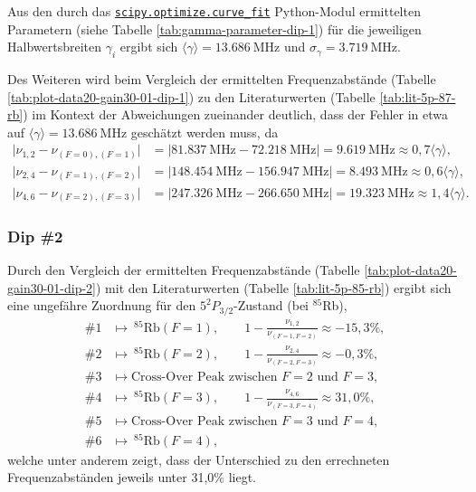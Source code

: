 \noindent Aus den durch das \href{https://docs.scipy.org/doc/scipy/reference/generated/scipy.optimize.curve_fit.html}{\texttt{scipy.optimize.curve_fit}} Python-Modul ermittelten Parametern (siehe Tabelle \ref{tab:gamma-parameter-dip-1}) für die jeweiligen Halbwertsbreiten $\gamma_{i}$ ergibt sich $\langle \gamma \rangle = \SI{13,686}{\mega \hertz}$ und $\sigma_{\gamma} = \SI{3,719}{\mega \hertz}$.

\noindent Des Weiteren wird beim Vergleich der ermittelten Frequenzabstände (Tabelle \ref{tab:plot-data20-gain30-01-dip-1}) zu den Literaturwerten (Tabelle \ref{tab:lit-5p-87-rb}) im Kontext der Abweichungen zueinander deutlich, dass der Fehler in etwa auf $\langle \gamma \rangle = \SI{13,686}{\mega \hertz}$ geschätzt werden muss, da 
\begin{align*}
    \big \vert \nu_{1,2} - \nu_{(F = 0), (F = 1)} \big \vert &= \big \vert \SI{81,837}{\mega \hertz} - \SI{72,218}{\mega \hertz} \big \vert = \SI{9,619}{\mega \hertz} \approx 0,7 \langle \gamma \rangle, \\
    \big \vert \nu_{2,4} - \nu_{(F = 1), (F = 2)} \big \vert &= \big \vert \SI{148,454}{\mega \hertz} - \SI{156,947}{\mega \hertz} \big \vert = \SI{8,493}{\mega \hertz} \approx 0,6 \langle \gamma \rangle, \\
    \big \vert \nu_{4,6} - \nu_{(F = 2), (F = 3)} \big \vert &= \big \vert \SI{247,326}{\mega \hertz} - \SI{266,650}{\mega \hertz} \big \vert = \SI{19,323}{\mega \hertz} \approx 1,4 \langle \gamma \rangle.
\end{align*}

\subsubsection{Dip \textcolor{green!50!black}{\#2}}

\noindent Durch den Vergleich der ermittelten Frequenzabstände (Tabelle \ref{tab:plot-data20-gain30-01-dip-2}) mit den Literaturwerten (Tabelle \ref{tab:lit-5p-85-rb}) ergibt sich eine ungefähre Zuordnung für den $5^{2}P_{3/2}$-Zustand (bei $^{85}$Rb), 
\begin{align*}
    \#1 &\mapsto \ ^{85}\text{Rb}(F = 1), \qquad 1 - \frac{\nu_{1,2}}{\nu_{(F = 1, F = 2)}} \approx -15,3\%, \\
    \#2 &\mapsto \ ^{85}\text{Rb}(F = 2), \qquad 1 - \frac{\nu_{2,4}}{\nu_{(F = 2, F = 3)}} \approx -0,3 \%, \\
    \#3 &\mapsto \text{Cross-Over Peak zwischen $F = 2$ und $F = 3$}, \\
    \#4 &\mapsto \ ^{85}\text{Rb}(F = 3), \qquad 1 - \frac{\nu_{4,6}}{\nu_{(F = 3, F = 4)}} \approx 31,0 \%, \\
    \#5 &\mapsto \text{Cross-Over Peak zwischen $F = 3$ und $F = 4$}, \\
    \#6 &\mapsto \ ^{85}\text{Rb}(F = 4),
\end{align*}
welche unter anderem zeigt, dass der Unterschied zu den errechneten Frequenzabständen jeweils unter 31,0\% liegt. \\

